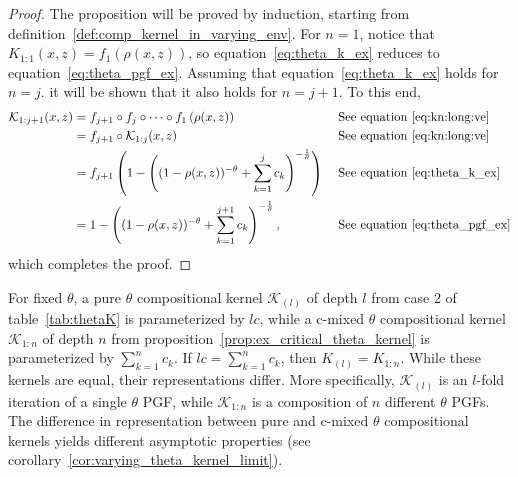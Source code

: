 \documentclass[final, 12pt]{colt2021} %
\begin{document}
\begin{proof}
The proposition will be proved by induction,
starting from definition~\ref{def:comp_kernel_in_varying_env}.
For $n=1$,
notice that
$K_{1:1}(x,z)=
f_{1}(\rho (x,z))$,
so equation~\eqref{eq:theta_k_ex}
reduces to equation~\eqref{eq:theta_pgf_ex}.
Assuming that equation~\eqref{eq:theta_k_ex} holds for $n=j$.
it will be shown that it also holds for $n=j+1$.
To this end,
\begin{alignat*}{2}
\mathcal{K}_{1:j+1}(x, z) &=
f_{j+1}\circ f_{j}\circ\dots\circ f_1
\left(\rho(x,z)\right) && \;
\mbox{See equation~\eqref{eq:kn:long:ve}}\\
&=
f_{j+1}\circ\mathcal{K}_{1:j}(x, z)
&& \;
\mbox{See equation~\eqref{eq:kn:long:ve}}
\\
&=
f_{j+1}\left(
1 - \left(
(1-\rho (x, z))^{-\theta}
+ \sum_{k = 1}^{j} c_k
\right)^{-\frac{1}{\theta}}
\right) && \;
\mbox{See equation~\eqref{eq:theta_k_ex}}
\\
&=
1 - \left(
(1-\rho (x, z))^{-\theta}
+ \sum_{k = 1}^{j+1} c_k
\right)^{-\frac{1}{\theta}},
&& \;
\mbox{See equation~\eqref{eq:theta_pgf_ex}}
\end{alignat*}
which completes the proof.
\end{proof}

For fixed $\theta$,
a pure $\theta$ compositional kernel $\mathcal{K}_{(l)}$
of depth $l$
from case $2$ of table~\ref{tab:thetaK}
is parameterized by $l c$,
while a c-mixed $\theta$ compositional kernel $\mathcal{K}_{1:n}$
of depth $n$ from proposition~\ref{prop:ex_critical_theta_kernel}
is parameterized by $\sum_{k = 1}^{n} c_{k}$.
If $l c = \sum_{k = 1}^{n} c_{k}$, then $K_{(l)} = K_{1:n}$.
While these kernels are equal,
their representations differ.
More specifically,
$\mathcal{K}_{(l)}$ is an $l$-fold iteration of a single $\theta$ PGF,
while $\mathcal{K}_{1:n}$ is a composition of $n$ different $\theta$ PGFs.
The difference in representation between pure and c-mixed
$\theta$ compositional kernels
yields different asymptotic properties
(see corollary~\ref{cor:varying_theta_kernel_limit}).

\end{document}
